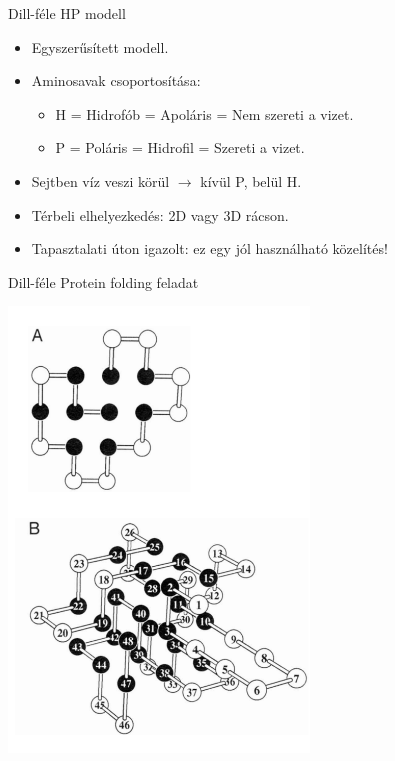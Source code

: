 \documentclass[aspectratio=169]{beamer}
\begin{document}
\begin{frame}{Dill-féle HP modell}
\begin{itemize}
    \item Egyszerűsített modell.
    \item Aminosavak csoportosítása:
    \begin{itemize}
        \item H = Hidrofób = Apoláris = Nem szereti a vizet.
        \item P = Poláris = Hidrofil = Szereti a vizet.
    \end{itemize}
    \item Sejtben víz veszi körül $\rightarrow$ kívül P, belül H.
    \item Térbeli elhelyezkedés: 2D vagy 3D rácson.
    \item Tapasztalati úton igazolt: ez egy jól használható közelítés!
\end{itemize}
\end{frame}

\begin{frame}{Dill-féle Protein folding feladat}
\begin{center}
\includegraphics[width=0.6\textwidth]{dipterv1_figures/hp_model.png}
\end{center}
\end{frame}
\end{document}
